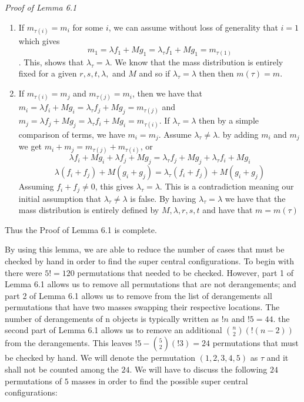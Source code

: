 \documentclass[11pt,leqno]{article}
\theoremstyle{definition}
\theoremstyle{remark}
\numberwithin{equation}{section}
\begin{document}
\textit{Proof of Lemma 6.1}
\begin{enumerate}
\item If $m_{\tau(i)}=m_i$ for some $i$, we can assume without loss of generality that $i=1$ which gives
$$ m_1=\lambda f_1+M g_1=\lambda_\tau f_1+M g_1=m_{\tau(1)}$$. This, shows that $\lambda_\tau=\lambda$. We know that the mass distribution is entirely fixed for a given $r,s,t,\lambda,$ and $M$ and so if $\lambda_\tau=\lambda$ then then $m(\tau)=m$.

\item If $m_{\tau(i)}=m_j$ and $m_{\tau(j)}=m_i$, then we have that $m_i=\lambda f_i +M g_i=\lambda_\tau f_j + M g_j=m_{\tau(j)}$ and $m_j=\lambda f_j +M g_j=\lambda_\tau f_i + M g_i=m_{\tau(i)}$. If $\lambda_\tau=\lambda$ then by a simple comparison of terms, we have $m_i=m_j$. Assume $\lambda_\tau \neq \lambda$. by adding $m_i$ and $m_j$ we get $m_i+m_j=m_{\tau(j)}+m_{\tau(i)}$, or 
$$\lambda f_i +M g_i+\lambda f_j +M g_j=\lambda_\tau f_j +M g_j+\lambda_\tau f_i + M g_i $$
$$\lambda (f_i +f_j) +M (g_i+g_j)=\lambda_\tau (f_i+f_j)+M(g_i+g_j)$$
Assuming $f_i+f_j \neq 0$, this gives $\lambda_\tau=\lambda$. This is a contradiction meaning our initial assumption that $\lambda_\tau \neq \lambda$ is false. By having $\lambda_\tau=\lambda$ we have that the mass distribution is entirely defined by $M, \lambda, r,s,t$ and have that $m=m(\tau)$
\end{enumerate}
Thus the Proof of Lemma 6.1 is complete.

By using this lemma, we are able to reduce the number of cases that must be checked by hand in order to find the super central configurations. To begin with there were $5!=120$ permutations that needed to be checked. 
However, part 1 of Lemma 6.1 allows us to remove all permutations that are not derangements; and part 2 of Lemma 6.1 allows us to remove from the list of derangements all permutations that have two masses swapping their respective locations. 
The number of derangements of n objects is typically written as $!n$ and $!5=44$. the second part of Lemma 6.1 allows us to remove an additional ${n \choose 2} (!(n-2))$ from the derangements. 
This leaves $!5-{5\choose 2}(!3)=24$ permutations that must be checked by hand. We will denote the permutation $(1,2,3,4,5)$ as $\tau$ and it shall not be counted among the $24$. We will have to discuss the following $24$ permutations of $5$ masses in order to find the possible super central configurations:
\end{document}
